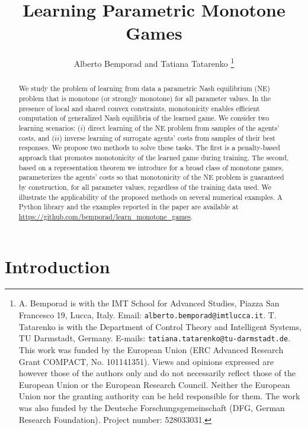 \documentclass[11pt, a4paper]{article}
\theoremstyle{remark}
\theoremstyle{plain}
\begin{document}
\title{Learning Parametric Monotone Games}

\author{Alberto Bemporad and Tatiana Tatarenko 
{\renewcommand{\thefootnote}{}\thanks{A. Bemporad is with the IMT School for Advanced Studies, Piazza San Francesco 19, Lucca, Italy. Email: \texttt{\scriptsize alberto.bemporad@imtlucca.it}. T. Tatarenko is with the Department of Control Theory and Intelligent Systems, TU Darmstadt, Germany. E-mails: \texttt{\scriptsize tatiana.tatarenko@tu-darmstadt.de}.   
This work was funded by the European Union (ERC Advanced Research Grant COMPACT, No. 101141351). Views and opinions expressed are however those of the authors only and do not necessarily reflect those of the European Union or the European Research Council. Neither the European Union nor the granting authority can be held responsible for them. The work was also funded by the Deutsche Forschungsgemeinschaft (DFG, German Research Foundation). Project number: 528033031.
}}}

\maketitle
\thispagestyle{empty}

\begin{abstract}
We study the problem of learning from data a parametric Nash equilibrium (NE) problem that is monotone (or strongly monotone) for all parameter values. In the presence of local and shared convex constraints,
monotonicity enables efficient computation of generalized Nash equilibria of the learned game.
We consider two learning scenarios: ($i$) direct learning of the NE problem from samples of the agents' costs, and ($ii$) inverse learning of surrogate agents' costs from samples of their best responses. We propose two methods to solve these tasks. The first is a penalty-based approach that promotes monotonicity of the learned game during training. 
The second, based on a representation theorem we introduce for a broad class of monotone games, parameterizes the agents' costs so that monotonicity of the NE problem is guaranteed by construction, for all parameter values, regardless of the training data used. We illustrate the applicability of the proposed methods on several numerical examples. A Python library and the examples reported in the paper are available at \url{https://github.com/bemporad/learn_monotone_games}.
\end{abstract}

\section{Introduction}
\end{document}
